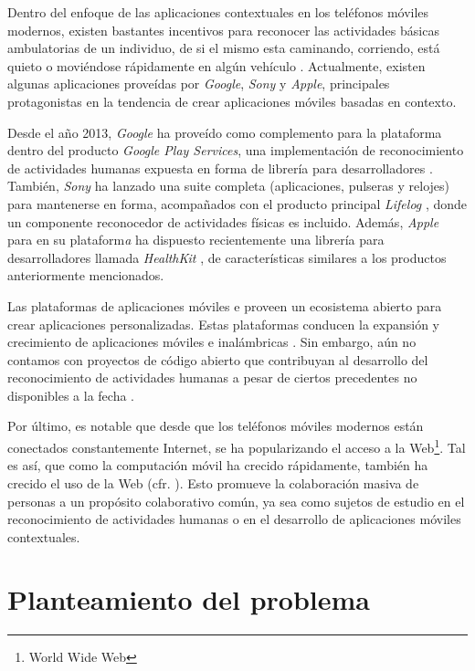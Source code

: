 Dentro del enfoque de las aplicaciones contextuales en los teléfonos
móviles modernos, existen bastantes incentivos para reconocer las
actividades básicas ambulatorias de un individuo, de si el mismo esta
caminando, corriendo, está quieto o moviéndose rápidamente en algún
vehículo \cite{CampuzanoLopez2015,Google2013l}. Actualmente, existen
algunas aplicaciones proveídas por \emph{Google}, \emph{Sony} y \emph{Apple},
principales protagonistas en la tendencia de crear aplicaciones móviles
basadas en contexto.

Desde el año 2013, \emph{Google} ha proveído como complemento para
la plataforma \emph{ }\cite{Google2005a} dentro del
producto \emph{Google Play Services}, una implementación de reconocimiento
de actividades humanas expuesta en forma de librería para desarrolladores
\cite{Google2013l}. También, \emph{Sony} ha lanzado una suite completa
(aplicaciones, pulseras y relojes) para mantenerse en forma, acompañados
con el producto principal \emph{Lifelog} \cite{Sony2016l}, donde
un componente reconocedor de actividades físicas es incluido. Además,
\emph{Apple} para en su plataform\emph{a } \cite{Apple2007i}
ha dispuesto recientemente una librería para desarrolladores llamada
\emph{HealthKit} \cite{Apple2016h}, de características similares
a los productos anteriormente mencionados. 

Las plataformas de aplicaciones móviles \emph{} e \emph{}
proveen un ecosistema abierto para crear aplicaciones personalizadas.
Estas plataformas conducen la expansión y crecimiento de aplicaciones
móviles e inalámbricas \cite{Tanenbaum2010}. Sin embargo, aún no
contamos con proyectos de código abierto que contribuyan al desarrollo
del reconocimiento de actividades humanas a pesar de ciertos precedentes
no disponibles a la fecha \cite{Kwapisz2011,LaraLabrador2013}.

Por último, es notable que desde que los teléfonos móviles modernos
están conectados constantemente Internet, se ha popularizando el acceso
a la Web\footnote{World Wide Web}. Tal es así, que como la computación
móvil ha crecido rápidamente, también ha crecido el uso de la Web
(cfr. \cite{NYTimes2008iph}). Esto promueve la colaboración masiva
de personas a un propósito colaborativo común, ya sea como sujetos
de estudio en el reconocimiento de actividades humanas o en el desarrollo
de aplicaciones móviles contextuales.

\section{Planteamiento del problema}

